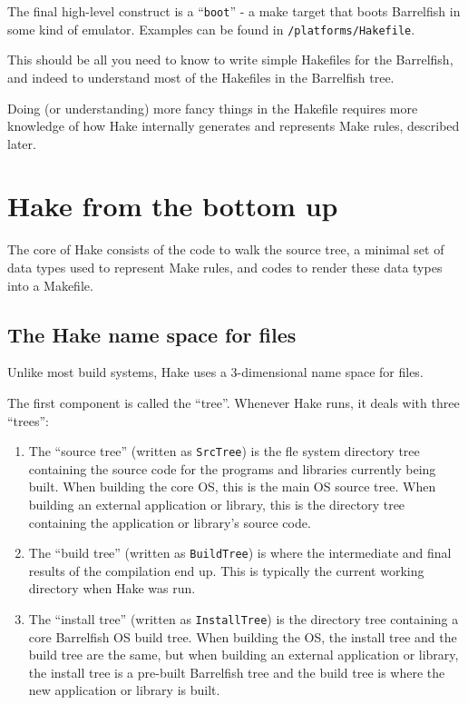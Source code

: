 \documentclass[a4paper,twoside]{report} %
\begin{document}
The final high-level construct is a ``\texttt{boot}'' - a make target
that boots Barrelfish in some kind of emulator.  Examples can be found
in \texttt{/platforms/Hakefile}. 

This should be all you need to know to write simple Hakefile{s} for
the Barrelfish, and indeed to understand most of the Hakefile{s} in
the Barrelfish tree.

Doing (or understanding) more fancy things in the Hakefile requires
more knowledge of how Hake internally generates and represents Make
rules, described later. 

\chapter{Hake from the bottom up}

The core of Hake consists of the code to walk the source tree, a
minimal set of data types used to represent Make rules, and codes to
render these data types into a Makefile.  

\section{The Hake name space for files}

Unlike most build systems, Hake uses a 3-dimensional name space for
files.  

The first component is called the ``tree''.  Whenever Hake runs, it
deals with three ``trees'':
\begin{enumerate}

\item The ``source tree'' (written as \texttt{SrcTree}) is the fle
  system directory tree containing the source code for the programs
  and libraries currently being built.  When building the core OS,
  this is the main OS source tree. When building an external
  application or library, this is the directory tree containing the
  application or library's source code. 

\item The ``build tree'' (written as \texttt{BuildTree}) is where the
  intermediate and final results of the compilation end up.  This is
  typically the current working directory when Hake was run. 

\item The ``install tree'' (written as \texttt{InstallTree}) is the
  directory tree containing a core Barrelfish OS build tree.  When
  building the OS, the install tree and the build tree are the same,
  but when building an external application or library, the install
  tree is a pre-built Barrelfish tree and the build tree is where the
  new application or library is built. 
\end{enumerate}
\end{document}
